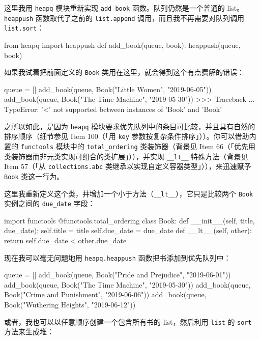 这里我用 \texttt{heapq} 模块重新实现 \texttt{add\_book} 函数。队列仍然是一个普通的 list。\texttt{heappush} 函数取代了之前的 \texttt{list.append} 调用，而且我不再需要对队列调用 \texttt{list.sort}：

\begin{codebox}[python]
from heapq import heappush
def add_book(queue, book):
    heappush(queue, book)
\end{codebox}

如果我试着把前面定义的 \texttt{Book} 类用在这里，就会得到这个有点费解的错误：

\begin{codebox}[python]
queue = []
add_book(queue, Book("Little Women", "2019-06-05"))
add_book(queue, Book("The Time Machine", "2019-05-30"))
>>>
Traceback ...
TypeError: '<' not supported between instances of 'Book' and
'Book'
\end{codebox}

之所以如此，是因为 \texttt{heapq} 模块要求优先队列中的条目可比较，并且具有自然的排序顺序（细节参见 Item 100（「用 \texttt{key} 参数按复杂条件排序」））。你可以借助内置的 \texttt{functools} 模块中的 \texttt{total\_ordering} 类装饰器（背景见 Item 66（「优先用类装饰器而非元类实现可组合的类扩展」）），并实现 \texttt{\_\_lt\_\_} 特殊方法（背景见 Item 57（「从 \texttt{collections.abc} 类继承以实现自定义容器类型」）），来迅速赋予 \texttt{Book} 类这一行为。

这里我重新定义这个类，并增加一个小于方法（\texttt{\_\_lt\_\_}），它只是比较两个 \texttt{Book} 实例之间的 \texttt{due\_date} 字段：

\begin{codebox}[python]
import functools
@functools.total_ordering
class Book:
    def __init__(self, title, due_date):
        self.title = title
        self.due_date = due_date
    def __lt__(self, other):
        return self.due_date < other.due_date
\end{codebox}

现在我可以毫无问题地用 \texttt{heapq.heappush} 函数把书添加到优先队列中：

\begin{codebox}[python]
queue = []
add_book(queue, Book("Pride and Prejudice", "2019-06-01"))
add_book(queue, Book("The Time Machine", "2019-05-30"))
add_book(queue, Book("Crime and Punishment", "2019-06-06"))
add_book(queue, Book("Wuthering Heights", "2019-06-12"))
\end{codebox}

或者，我也可以以任意顺序创建一个包含所有书的 list，然后利用 \texttt{list} 的 \texttt{sort} 方法来生成堆：

